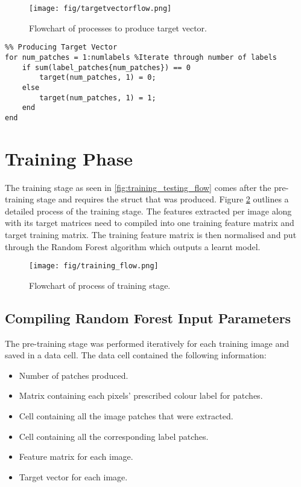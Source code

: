 \begin{figure}[H]
\centering
\texttt{[image: fig/targetvectorflow.png]}
\caption{Flowchart of processes to produce target vector.}
\label{fig:targetvectorflow}
\end{figure}
\bigskip
\bigskip
\begin{lstlisting}
%% Producing Target Vector
for num_patches = 1:numlabels %Iterate through number of labels
    if sum(label_patches{num_patches}) == 0
        target(num_patches, 1) = 0;
    else 
        target(num_patches, 1) = 1;
    end
end
\end{lstlisting}

\section{Training Phase} 
\label{sect: trainstage}
The training stage as seen in \ref{fig:training_testing_flow} comes after the pre-training stage and requires the struct that was produced. Figure \ref{fig:trainingflow} outlines a detailed process of the training stage. The features extracted per image along with its target matrices need to compiled into one training feature matrix and target training matrix. The training feature matrix is then normalised and put through the Random Forest algorithm which outputs a learnt model. 

\begin{figure}[H]
\centering
\texttt{[image: fig/training\_flow.png]}
\caption{Flowchart of process of training stage.}
\label{fig:trainingflow}
\end{figure}
\subsection{Compiling Random Forest Input Parameters}
The pre-training stage was performed iteratively for each training image and saved in a data cell. The data cell contained the following information: 
\begin{itemize}
	\item Number of patches produced.
	\item Matrix containing each pixels' prescribed colour label for patches.
	\item Cell containing all the image patches that were extracted.
	\item Cell containing all the corresponding label patches.
	\item Feature matrix for each image.
	\item Target vector for each image. 
\end{itemize}


